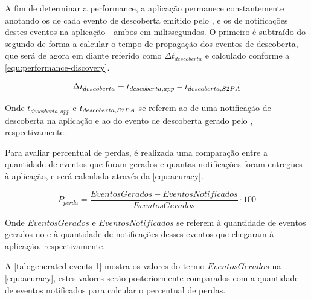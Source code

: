 A fim de determinar a performance, a aplicação permanece constantemente anotando os \timestamps de cada evento de descoberta emitido pelo \stwopa, e os \timestamps de notificações destes eventos na aplicação---ambos em milissegundos. O primeiro \timestamp é subtraído do segundo de forma a calcular o tempo de propagação dos eventos de descoberta, que será de agora em diante referido como $\Delta t_{descoberta}$ e calculado conforme a \autoref{equ:performance-discovery}.

\begin{equation}
	\label{equ:performance-discovery}
	\Delta t_{descoberta} = t_{descoberta,app} - t_{descoberta,S2PA}
\end{equation}

Onde $t_{descoberta,app}$ e $t_{descoberta,S2PA}$ se referem ao \timestamp de uma notificação de descoberta na aplicação e ao \timestamp do evento de descoberta gerado pelo \stwopa, respectivamente.

Para avaliar percentual de perdas, é realizada uma comparação entre a quantidade de eventos que foram gerados e quantas notificações foram entregues à aplicação, e será calculada através da \autoref{equ:acuracy}.

\begin{equation}
	\label{equ:acuracy}
	P_{perda} = \frac{EventosGerados - EventosNotificados}{EventosGerados} \cdot 100
\end{equation}

Onde $EventosGerados$ e $EventosNotificados$ se referem à quantidade de eventos gerados no \stwopa e à quantidade de notificações desses eventos que chegaram à aplicação, respectivamente.

A \autoref{tab:generated-events-1} mostra os valores do termo $EventosGerados$ na \autoref{equ:acuracy}, estes valores serão posteriormente comparados com a quantidade de eventos notificados para calcular o percentual de perdas.

\begin{table}[htb]
	\begin{center}
	\end{center}
\end{table}


